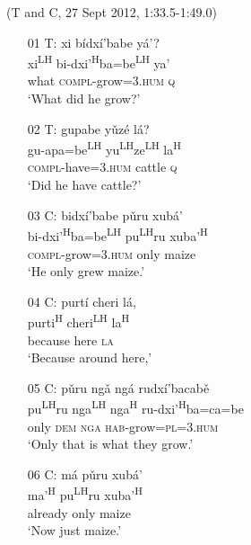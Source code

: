 \ea (T and C, 27 Sept 2012, 1:33.5-1:49.0)
\begin{itemize}

\item[01 T:]
xi b\'{i}dx\'{i}'babe y\'{a}'? \\
xi\textsuperscript{LH} bi-dxi'\textsuperscript{H}ba=be\textsuperscript{LH} ya' \\
what \textsc{compl}-grow=\textsc{3.hum} \textsc{q} \\
\glt `What did he grow?'



\item[02 T:]
gupabe y\v{u}z\'{e} l\'{a}? \\
gu-apa=be\textsuperscript{LH} yu\textsuperscript{LH}ze\textsuperscript{LH} la\textsuperscript{H} \\
\textsc{compl}-have=\textsc{3.hum} cattle \textsc{q} \\
\glt `Did he have cattle?'


\item[03 C:] 
\glll bidx\'{i}'babe p\v{u}ru xub\'{a}' \\
bi-dxi'\textsuperscript{H}ba=be\textsuperscript{LH} pu\textsuperscript{LH}ru xuba'\textsuperscript{H} \\
\textsc{compl}-grow=\textsc{3.hum} only maize \\
\glt `He only grew maize.'  


\item[04 C:] 
\glll purt\'{i} cheri l\'{a},  \\
purti\textsuperscript{H} cheri\textsuperscript{LH} la\textsuperscript{H}  \\
because here \textsc{la} \\
\glt `Because around here,'


\item[05 C:] 
\glll p\v{u}ru ng\v{a} ng\'{a} rudx\'{i}'bacab\v{e} \\
pu\textsuperscript{LH}ru nga\textsuperscript{LH} nga\textsuperscript{H} ru-dxi'\textsuperscript{H}ba=ca=be \\
only \textsc{dem} \textsc{nga} \textsc{hab}-grow=\textsc{pl=3.hum} \\
\glt `Only that is what they grow.' 


\item[06 C:]
\glll m\'{a} p\v{u}ru xub\'{a}'  \\
ma'\textsuperscript{H} pu\textsuperscript{LH}ru xuba'\textsuperscript{H}   \\
already only maize \\
\glt `Now just maize.'  



\end{itemize}
